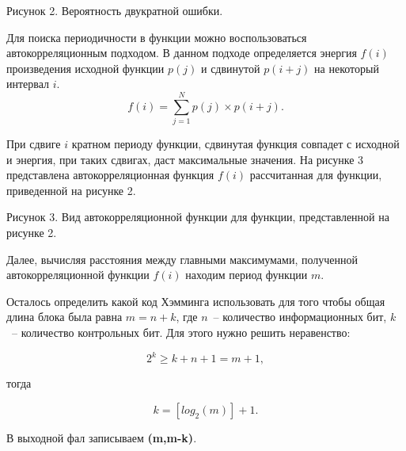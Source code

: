 
\begin{center}
    Рисунок 2. Вероятность двукратной ошибки.
\end{center}

Для поиска периодичности в функции можно воспользоваться автокорреляционным подходом. В данном подходе определяется энергия $f(i)$  произведения исходной функции $p(j)$ и сдвинутой $p(i+j)$ на некоторый интервал $i$.
$$f(i)=\sum_{j=1}^N p(j) \times p(i+j).$$

При сдвиге $i$ кратном периоду функции, сдвинутая функция совпадет с исходной и энергия, при таких сдвигах, даст максимальные значения. На рисунке 3 представлена автокорреляционная функция $f(i)$ рассчитанная для функции, приведенной на рисунке 2.


\begin{center}
    Рисунок 3. Вид автокорреляционной функции для функции, представленной на рисунке 2.
\end{center}

Далее, вычисляя расстояния между главными максимумами, полученной автокорреляционной функции $f(i)$ находим период функции $m$.

Осталось определить какой код Хэмминга использовать для того чтобы общая длина блока была равна $m = n+k$, где $n$~– количество информационных бит, $k$~– количество контрольных бит. Для этого нужно решить неравенство:

$$2^k \geq k+n+1=m+1,$$

тогда 

$$k=[log_2(m)]+1.$$

В выходной фал записываем \textbf{(m,m-k)}.
